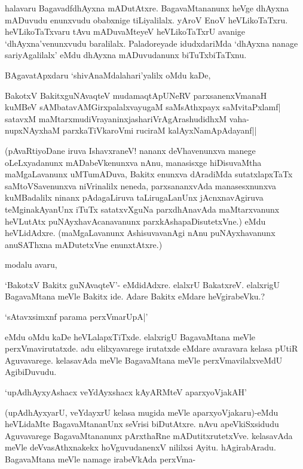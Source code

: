halavaru BagavadfdhAyxna mADutAtxre. BagavaMtananunx heVge dhAyxna mADuvudu enunxvudu obabxnige tiLiyalilalx. yAroV EnoV heVLikoTaTxru. heVLikoTaTxvaru tAvu mADuvaMteyeV heVLikoTaTxrU avanige `dhAyxna'venunxvudu baralilalx. Paladoreyade idudxdariMda `dhAyxna nanage sariyAgalilalx' eMdu dhAyxna mADuvudanunx biTuTxbiTaTxnu.

BAgavatApxdaru `shivAnaMdalahari'yalilx oMdu kaDe,

\begin{shloka}
BakotxV BakitxguNAvaqteV mudamaqtApUNeRV parxsanenxVmanaH\\
kuMBeV sAMbatavAMGirxpalalxvayugaM saMsAthxpayx saMvitaPxlamf|\\
satavxM maMtarxmudiVrayaninxjashariVrAgArashudidhxM vaha-\\
nupxNAyxhaM parxkaTiVkaroVmi ruciraM kalAyxNamApAdayanf||
\end{shloka}

(pAvaRtiyoDane iruva IshavxraneV! nananx deVhavenunxva manege oLeLxyadanunx mADabeVkenunxva nAnu, manasisxge hiDisuvaMtha maMgaLavanunx uMTumADuva, Bakitx enunxva dAradiMda sutatxlapxTaTx saMtoVSavenunxva niVrinalilx neneda, parxsananxvAda manasesxnunxva kuMBadalilx ninanx pAdagaLiruva taLirugaLanUnx jAcnxnavAgiruva teMginakAyanUnx iTuTx satatxvXguNa parxdhAnavAda maMtarxvanunx heVLutAtx puNAyxhavAcanavanunx parxkAshapaDisutetxVne.) eMdu heVLidAdxre. (maMgaLavanunx AshisuvavanAgi nAnu puNAyxhavanunx anuSAThxna mADutetxVne enunxtAtxre.)

modalu avaru, 

`BakotxV Bakitx guNAvaqteV'- eMdidAdxre. elalxrU BakatxreV. elalxrigU BagavaMtana meVle Bakitx ide. Adare Bakitx eMdare heVgirabeVku.?

\begin{shloka}
`sAtavxsimxnf parama perxVmarUpA|'
\end{shloka}

\noindent eMdu oMdu kaDe heVLalapxTiTxde. elalxrigU BagavaMtana meVle perxVmavirutatxde. adu elilxyavarege irutatxde eMdare avaravara kelasa pUtiR Aguvavarege. kelasavAda meVle BagavaMtana meVle perxVmavilalxveMdU AgibiDuvudu.

\begin{shloka}
`upAdhAyxyAshacx veYdAyxshacx kAyARMteV aparxyoVjakAH'
\end{shloka}

(upAdhAyxyarU, veYdayxrU kelasa mugida meVle aparxyoVjakaru)-eMdu heVLidaMte BagavaMtananUnx seVrisi biDutAtxre. nAvu apeVkiSxsidudu Aguvavarege BagavaMtananunx pArxthaRne mADutitxrutetxVve. kelasavAda meVle deVvasAthxnakekx hoVguvudanenxV nililxsi Ayitu. hAgirabAradu. BagavaMtana meVle namage irabeVkAda perxVma-


